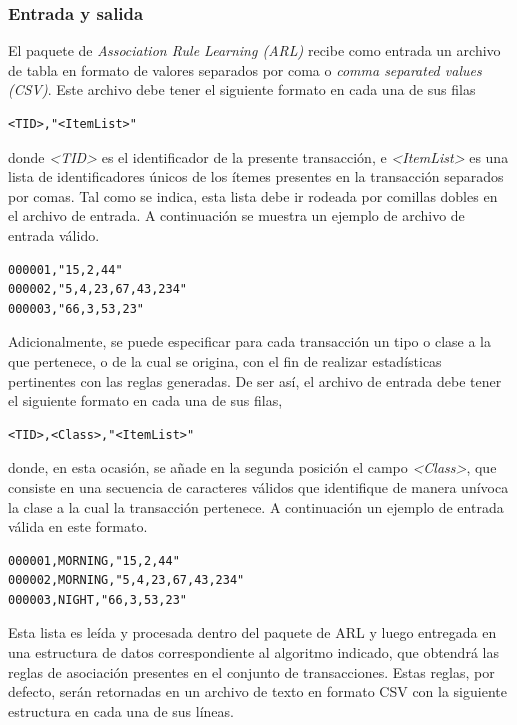 \subsubsection{Entrada y salida}

El paquete de \textit{Association Rule Learning (ARL)} recibe como entrada un archivo de tabla en formato de valores separados por coma o \textit{comma separated values (CSV)}. Este archivo debe tener el siguiente formato en cada una de sus filas

\begin{lstlisting}[basicstyle=\ttfamily]
<TID>,"<ItemList>"
\end{lstlisting}

donde \textit{<TID>} es el identificador de la presente transacción, e \textit{<ItemList>} es una lista de identificadores únicos de los ítemes presentes en la transacción separados por comas. Tal como se indica, esta lista debe ir rodeada por comillas dobles en el archivo de entrada. A continuación se muestra un ejemplo de archivo de entrada válido.

\begin{lstlisting}[basicstyle=\ttfamily]
000001,"15,2,44"
000002,"5,4,23,67,43,234"
000003,"66,3,53,23"
\end{lstlisting}

Adicionalmente, se puede especificar para cada transacción un tipo o clase a la que pertenece, o de la cual se origina, con el fin de realizar estadísticas pertinentes con las reglas generadas. De ser así, el archivo de entrada debe tener el siguiente formato en cada una de sus filas,

\begin{lstlisting}[basicstyle=\ttfamily]
<TID>,<Class>,"<ItemList>"
\end{lstlisting}

donde, en esta ocasión, se añade en la segunda posición el campo \textit{<Class>}, que consiste en una secuencia de caracteres válidos que identifique de manera unívoca la clase a la cual la transacción pertenece. A continuación un ejemplo de entrada válida en este formato.

\begin{lstlisting}[basicstyle=\ttfamily]
000001,MORNING,"15,2,44"
000002,MORNING,"5,4,23,67,43,234"
000003,NIGHT,"66,3,53,23"
\end{lstlisting}

Esta lista es leída y procesada dentro del paquete de ARL y luego entregada en una estructura de datos correspondiente al algoritmo indicado, que obtendrá las reglas de asociación presentes en el conjunto de transacciones. Estas reglas, por defecto, serán retornadas en un archivo de texto en formato CSV con la siguiente estructura en cada una de sus líneas.

